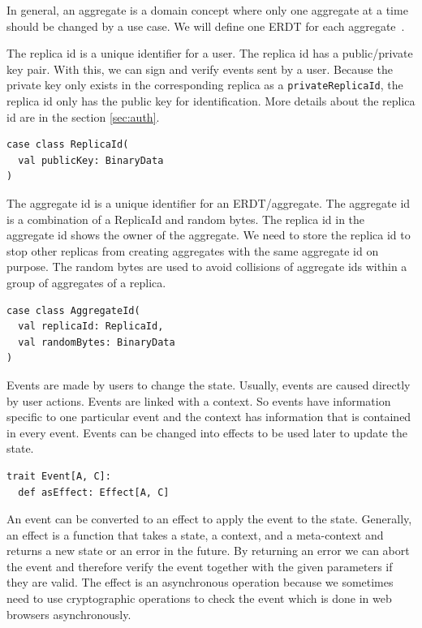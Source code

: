 \documentclass[
	english,
	ruledheaders=section,   %
	class=report,		    %
	thesis={type=bachelor}, %
	accentcolor=9c,			%
	custommargins=true,    %
	marginpar=false,        %
	parskip=half-,          %
	fontsize=11pt,          %
]{tudapub}
\begin{document}
In general, an aggregate is a domain concept where only one aggregate at a time should be changed by a use case. We will define one ERDT for each aggregate~\cite{evans2004ddd}.

The replica id is a unique identifier for a user. The replica id has a public/private key pair. With this, we can sign and verify events sent by a user. Because the private key only exists in the corresponding replica as a \texttt{privateReplicaId}, the replica id only has the public key for identification. More details about the replica id are in the section \ref{sec:auth}.

\begin{lstlisting}
case class ReplicaId(
  val publicKey: BinaryData
)
\end{lstlisting}

The aggregate id is a unique identifier for an ERDT/aggregate. The aggregate id is a combination of a ReplicaId and random bytes. The replica id in the aggregate id shows the owner of the aggregate. We need to store the replica id to stop other replicas from creating aggregates with the same aggregate id on purpose. The random bytes are used to avoid collisions of aggregate ids within a group of aggregates of a replica.

\begin{lstlisting}
case class AggregateId(
  val replicaId: ReplicaId,
  val randomBytes: BinaryData
)
\end{lstlisting}

Events are made by users to change the state. Usually, events are caused directly by user actions. Events are linked with a context. So events have information specific to one particular event and the context has information that is contained in every event. Events can be changed into effects to be used later to update the state.

\begin{lstlisting}
trait Event[A, C]:
  def asEffect: Effect[A, C]
\end{lstlisting}

An event can be converted to an effect to apply the event to the state. Generally, an effect is a function that takes a state, a context, and a meta-context and returns a new state or an error in the future. By returning an error we can abort the event and therefore verify the event together with the given parameters if they are valid. The effect is an asynchronous operation because we sometimes need to use cryptographic operations to check the event which is done in web browsers asynchronously.
\end{document}
